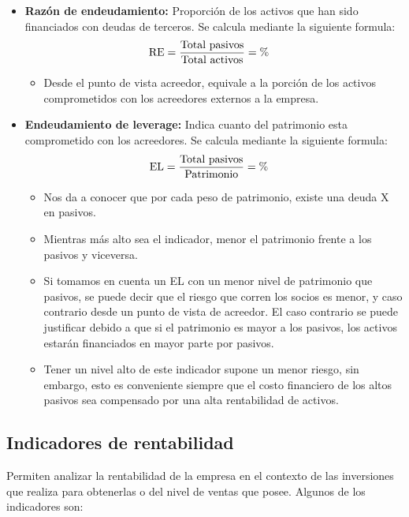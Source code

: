 \documentclass{templateNote}
\begin{document}
\begin{itemize}
    \item \textbf{Razón de endeudamiento:} Proporción de los activos que han sido financiados con deudas de terceros. Se calcula mediante la siguiente formula:
    \begin{align*}
        \textnormal{RE} &= \frac{\textnormal{Total pasivos}}{\textnormal{Total activos}} = \%
    \end{align*}
    \begin{itemize}
        \item Desde el punto de vista acreedor, equivale a la porción de los activos comprometidos con los acreedores externos a la empresa.
    \end{itemize}
    \item \textbf{Endeudamiento de leverage:} Indica cuanto del patrimonio esta comprometido con los acreedores. Se calcula mediante la siguiente formula: 
    \begin{align*}
        \textnormal{EL} &= \frac{\textnormal{Total pasivos}}{\textnormal{Patrimonio}} = \%
    \end{align*}
    \begin{itemize}
        \item Nos da a conocer que por cada peso de patrimonio, existe una deuda X en pasivos.
        \item Mientras más alto sea el indicador, menor el patrimonio frente a los pasivos y viceversa.
        \item Si tomamos en cuenta un EL con un menor nivel de patrimonio que pasivos, se puede decir que el riesgo que corren los socios es menor, y caso contrario desde un punto de vista de acreedor. El caso contrario se puede justificar debido a que si el patrimonio es mayor a los pasivos, los activos estarán financiados en mayor parte por pasivos.
        \item Tener un nivel alto de este indicador supone un menor riesgo, sin embargo, esto es conveniente siempre que el costo financiero de los altos pasivos sea compensado por una alta rentabilidad de activos.
    \end{itemize}
\end{itemize}

\subsection{Indicadores de rentabilidad}
\noindent Permiten analizar la rentabilidad de la empresa en el contexto de las inversiones que realiza para obtenerlas o del nivel de ventas que posee. Algunos de los indicadores son:
\end{document}
